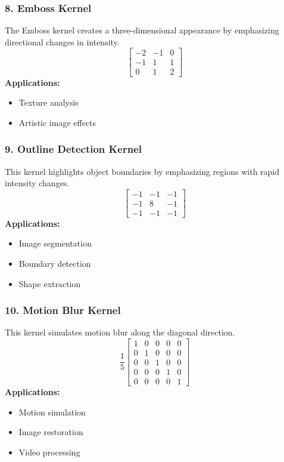 \documentclass[11pt]{article}
\begin{document}
\subsubsection*{8. Emboss Kernel}
The Emboss kernel creates a three-dimensional appearance by emphasizing directional changes in intensity.
\[
\begin{bmatrix}
-2 & -1 & 0 \\
-1 & 1 & 1 \\
0 & 1 & 2
\end{bmatrix}
\]
\textbf{Applications:}
\begin{itemize}
    \item Texture analysis
    \item Artistic image effects
\end{itemize}

\subsubsection*{9. Outline Detection Kernel}
This kernel highlights object boundaries by emphasizing regions with rapid intensity changes.
\[
\begin{bmatrix}
-1 & -1 & -1 \\
-1 & 8 & -1 \\
-1 & -1 & -1
\end{bmatrix}
\]
\textbf{Applications:}
\begin{itemize}
    \item Image segmentation
    \item Boundary detection
    \item Shape extraction
\end{itemize}

\subsubsection*{10. Motion Blur Kernel}
This kernel simulates motion blur along the diagonal direction.
\[
\frac{1}{5}
\begin{bmatrix}
1 & 0 & 0 & 0 & 0 \\
0 & 1 & 0 & 0 & 0 \\
0 & 0 & 1 & 0 & 0 \\
0 & 0 & 0 & 1 & 0 \\
0 & 0 & 0 & 0 & 1
\end{bmatrix}
\]
\textbf{Applications:}
\begin{itemize}
    \item Motion simulation
    \item Image restoration
    \item Video processing
\end{itemize}
\clearpage
\end{document}

